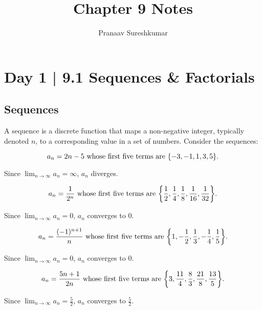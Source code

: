 \documentclass[10pt]{article}
\title{Chapter 9 Notes}
\author{Pranaav Sureshkumar}
\theoremstyle{definition}
\DeclarePairedDelimiter{\curly}{\{}{\}}
\begin{document}
\maketitle

\tableofcontents



\section{Day 1 | 9.1 Sequences \& Factorials}

\vspace{0.5cm}

\subsection{Sequences}
A sequence is a discrete function that maps a non-negative integer, typically denoted $n$, to a corresponding value in a set of numbers.
Consider the sequences:



\[a_n  = 2n-5 \text{ whose first five terms are } \curly*{-3, -1, 1, 3, 5}.\]
\begin{center}
    Since $\displaystyle\lim_{n \to \infty} a_n =\infty$, $a_n$ diverges.
\end{center}

\[a_n  = \frac{1}{2^n} \text{ whose first five terms are } \curly*{\frac{1}{2}, \frac{1}{4}, \frac{1}{8}, \frac{1}{16}, \frac{1}{32}}.\]

\begin{center}
    Since $\displaystyle\lim_{n \to \infty} a_n = 0$, $a_n$ converges to 0.
\end{center}

\[a_n  = \frac{(-1)^{n+1}}{n} \text{ whose first five terms are } \curly*{1, -\frac{1}{2}, \frac{1}{3}, -\frac{1}{4}, \frac{1}{5}}.\]

\begin{center}
    Since $\displaystyle\lim_{n \to \infty} a_n = 0$, $a_n$ converges to 0.
\end{center}

\[a_n  = \frac{5n+1}{2n} \text{ whose first five terms are } \curly*{3, \frac{11}{4}, \frac{8}{3}, \frac{21}{8}, \frac{13}{5}}.\]

\begin{center}
    Since $\displaystyle\lim_{n \to \infty} a_n = \frac{5}{2}$, $a_n$ converges to $\frac{5}{2}$.
\end{center}
\end{document}
